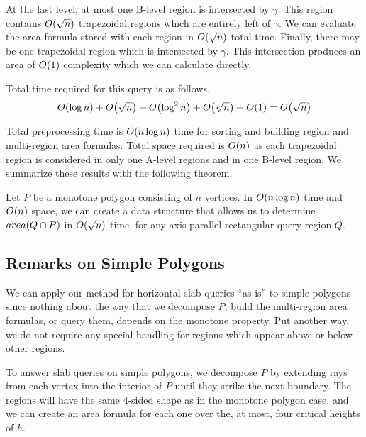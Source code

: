At the last level, at most one B-level region is intersected by $\gamma$. 
This region contains $O\!\left(\sqrt{n}\right)$ trapezoidal regions which are entirely left of $\gamma$.
We can evaluate the area formula stored with each region in $O\!\left(\sqrt{n}\right)$ total time.
Finally, there may be one trapezoidal region which is intersected by $\gamma$.
This intersection produces an area of $O\!\left(1\right)$ complexity which we can calculate directly.

Total time required for this query is as follows.
\[
O\!\left(\log{n}\right) + O\!\left(\sqrt{n}\right) + O\!\left(\log^2{n}\right) + O\!\left(\sqrt{n}\right) + O\!\left(1\right) = O\!\left(\sqrt{n}\right)
\]

Total preprocessing time is $O\!\left(n \log{n}\right)$ time for sorting and building region and multi-region area formulas.  Total space required is $O\!\left(n\right)$ as each trapezoidal region is considered in only one A-level regions and in one B-level region. We summarize these results with the following theorem.

\begin{theorem}
\label{th:mono2}
Let $P$ be a monotone polygon consisting of $n$ vertices. In $O\!\left(n \log{n}\right)$ time and $O\!\left(n\right)$ space, we can create a data structure that allows us to determine $area(Q \cap P)$ in $O\!\left(\sqrt{n}\right)$ time, for any axis-parallel rectangular query region $Q$.
\end{theorem}


\subsection{Remarks on Simple Polygons}
\label{:monotonep:simplep}

We can apply our method for horizontal slab queries ``as is'' to simple polygons since nothing about the way that we decompose $P$, build the multi-region area formulas, or query them, depends on the monotone property.  Put another way, we do not require any special handling for regions which appear above or below other regions.

To answer slab queries on simple polygons, we decompose $P$ by extending rays from each vertex into the interior of $P$ until they strike the next boundary.  The regions will have the same 4-sided shape as in the monotone polygon case, and we can create an area formula for each one over the, at most, four critical heights of $h$.

